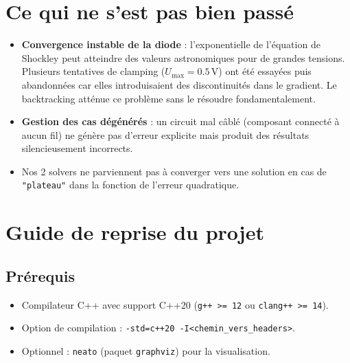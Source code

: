 \documentclass[12pt,a4paper]{article}
\begin{document}
\section{Ce qui ne s'est pas bien passé}

\begin{itemize}
  \item \textbf{Convergence instable de la diode} : l'exponentielle de l'équation
        de Shockley peut atteindre des valeurs astronomiques pour de grandes tensions.
        Plusieurs tentatives de clamping ($U_{\max} = 0.5\,\text{V}$) ont été essayées
        puis abandonnées car elles introduisaient des discontinuités dans le gradient.
        Le backtracking atténue ce problème sans le résoudre fondamentalement.

  \item \textbf{Gestion des cas dégénérés} : un circuit mal câblé (composant
        connecté à aucun fil) ne génère pas d'erreur explicite mais produit
        des résultats silencieusement incorrects.

  \item Nos 2 solvers ne parviennent pas à converger vers une solution en cas de \texttt{"plateau"} dans la fonction de l'erreur quadratique. 
\end{itemize}

\section{Guide de reprise du projet}

\subsection{Prérequis}

\begin{itemize}
  \item Compilateur C++ avec support C++20 (\texttt{g++ >= 12} ou \texttt{clang++ >= 14}).
  \item Option de compilation : \texttt{-std=c++20 -I<chemin\_vers\_headers>}.
  \item Optionnel : \texttt{neato} (paquet \texttt{graphviz}) pour la visualisation.
\end{itemize}
\end{document}
